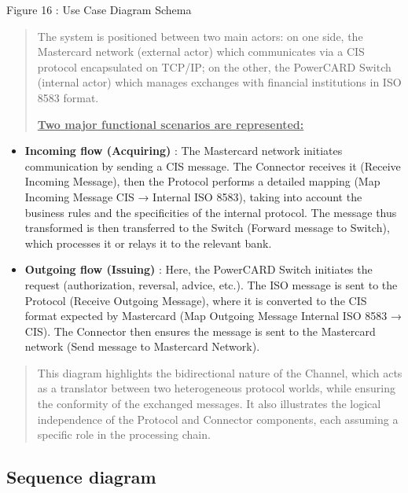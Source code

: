 \documentclass[12pt,a4paper]{report}
\begin{document}
\protect\hypertarget{_Toc201954492}{}{}Figure 16 : Use Case Diagram
Schema

\begin{quote}
The system is positioned between two main actors: on one side, the
Mastercard network (external actor) which communicates via a CIS
protocol encapsulated on TCP/IP; on the other, the PowerCARD Switch
(internal actor) which manages exchanges with financial institutions in
ISO 8583 format.

\textbf{\uline{Two major functional scenarios are represented:}}
\end{quote}

\begin{itemize}
\item
  \textbf{Incoming flow (Acquiring)} : The Mastercard network initiates
  communication by sending a CIS message. The Connector receives it
  (Receive Incoming Message), then the Protocol performs a detailed
  mapping (Map Incoming Message CIS → Internal ISO 8583), taking into
  account the business rules and the specificities of the internal
  protocol. The message thus transformed is then transferred to the
  Switch (Forward message to Switch), which processes it or relays it to
  the relevant bank.
\item
  \textbf{Outgoing flow (Issuing)} : Here, the PowerCARD Switch
  initiates the request (authorization, reversal, advice, etc.). The ISO
  message is sent to the Protocol (Receive Outgoing Message), where it
  is converted to the CIS format expected by Mastercard (Map Outgoing
  Message Internal ISO 8583 → CIS). The Connector then ensures the
  message is sent to the Mastercard network (Send message to Mastercard
  Network).
\end{itemize}

\begin{quote}
This diagram highlights the bidirectional nature of the Channel, which
acts as a translator between two heterogeneous protocol worlds, while
ensuring the conformity of the exchanged messages. It also illustrates
the logical independence of the Protocol and Connector components, each
assuming a specific role in the processing chain.
\end{quote}

\hypertarget{sequence-diagram}{%
\subsection{\texorpdfstring{\textbf{Sequence
diagram}}{Sequence diagram}}\label{sequence-diagram}}
\end{document}
